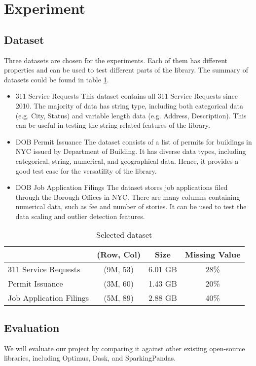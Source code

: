 \documentclass[sigconf]{acmart}
\begin{document}
\section{Experiment}
\subsection{Dataset}
Three datasets are chosen for the experiments. Each of them has different properties and can be used to test different parts of the library. The summary of datasets could be found in table \ref{tab:dataset}.
\begin{itemize}
	\item{311 Service Requests}\cite{nycopendata1} This dataset contains all 311 Service Requests since 2010. The majority of data has string type, including both categorical  data (e.g. City, Status) and variable length data (e.g. Address, Description). This can be useful in testing the string-related features of the library.
	\item{DOB Permit Issuance}\cite{nycopendata2} The dataset consists of a list of permits for buildings in NYC issued by Department of Building. It has diverse data types, including categorical, string, numerical, and geographical data. Hence, it provides a good test case for the versatility of the library. 
	\item{DOB Job Application Filings}\cite{nycopendata3} The dataset stores job applications filed through the Borough Offices in NYC. There are many columns containing numerical data, such as fee and number of stories. It can be used to test the data scaling and outlier detection features. 
\end{itemize}

\begin{table}
\caption{Selected dataset}   
\label{tab:dataset}
\begin{tabular}{lccc}   
 		                 & (Row, Col)  & Size      & Missing Value  \\  
\hline
 311 Service Requests   & (9M, 53)     & 6.01 GB  & 28\%            \\ 
 Permit Issuance            & (3M, 60)     & 1.43 GB  & 20\%             \\  
 Job Application Filings   & (5M, 89)     & 2.88 GB  & 40\%             \\ 


\end{tabular}   
\end{table}

\subsection{Evaluation}
We will evaluate our project by comparing it against other existing open-source libraries, including Optimus\cite{optimus}, Dask\cite{dask}, and SparkingPandas\cite{sparklingpandas}. 
\end{document}
